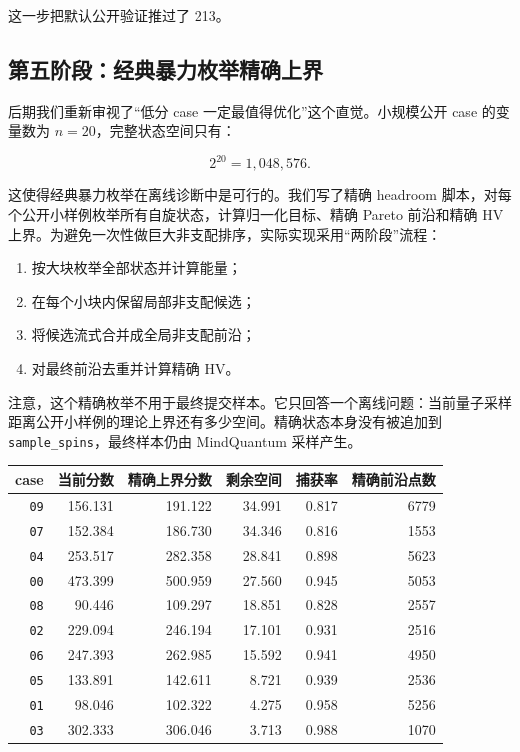 \documentclass[UTF8,zihao=-4]{ctexart}
\newcommand{\code}[1]{\texttt{#1}}
\begin{document}
这一步把默认公开验证推过了 213。

\subsection{第五阶段：经典暴力枚举精确上界}

后期我们重新审视了“低分 case 一定最值得优化”这个直觉。小规模公开 case 的变量数为 \(n=20\)，完整状态空间只有：

\[
2^{20}=1,048,576.
\]

这使得经典暴力枚举在离线诊断中是可行的。我们写了精确 headroom 脚本，对每个公开小样例枚举所有自旋状态，计算归一化目标、精确 Pareto 前沿和精确 HV 上界。为避免一次性做巨大非支配排序，实际实现采用“两阶段”流程：

\begin{enumerate}
  \item 按大块枚举全部状态并计算能量；
  \item 在每个小块内保留局部非支配候选；
  \item 将候选流式合并成全局非支配前沿；
  \item 对最终前沿去重并计算精确 HV。
\end{enumerate}

注意，这个精确枚举不用于最终提交样本。它只回答一个离线问题：当前量子采样距离公开小样例的理论上界还有多少空间。精确状态本身没有被追加到 \code{sample\_spins}，最终样本仍由 MindQuantum 采样产生。

\begin{center}
\begin{tabular}{rrrrrr}
\toprule
case & 当前分数 & 精确上界分数 & 剩余空间 & 捕获率 & 精确前沿点数 \\
\midrule
\code{09} & 156.131 & 191.122 & 34.991 & 0.817 & 6779 \\
\code{07} & 152.384 & 186.730 & 34.346 & 0.816 & 1553 \\
\code{04} & 253.517 & 282.358 & 28.841 & 0.898 & 5623 \\
\code{00} & 473.399 & 500.959 & 27.560 & 0.945 & 5053 \\
\code{08} & 90.446 & 109.297 & 18.851 & 0.828 & 2557 \\
\code{02} & 229.094 & 246.194 & 17.101 & 0.931 & 2516 \\
\code{06} & 247.393 & 262.985 & 15.592 & 0.941 & 4950 \\
\code{05} & 133.891 & 142.611 & 8.721 & 0.939 & 2536 \\
\code{01} & 98.046 & 102.322 & 4.275 & 0.958 & 5256 \\
\code{03} & 302.333 & 306.046 & 3.713 & 0.988 & 1070 \\
\bottomrule
\end{tabular}
\end{center}
\end{document}
